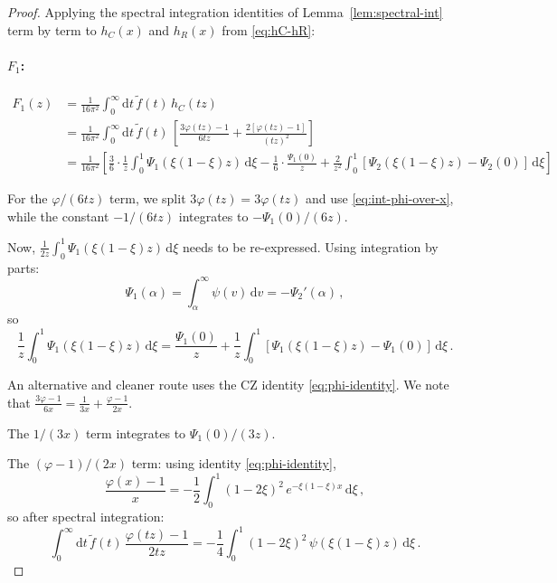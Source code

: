 \documentclass[11pt,a4paper]{article}
\renewcommand{\dd}{\mathrm{d}}
\theoremstyle{definition}
\theoremstyle{remark}
\begin{document}
\begin{proof}
Applying the spectral integration identities of
Lemma~\ref{lem:spectral-int} term by term to
$h_C(x)$ and $h_R(x)$ from \eqref{eq:hC-hR}:

\paragraph{$F_1$:}
\begin{align*}
  F_1(z) &= \frac{1}{16\pi^2}\int_0^\infty\dd t\,\tilde{f}(t)\,
  h_C(tz)\\
  &= \frac{1}{16\pi^2}\int_0^\infty\dd t\,\tilde{f}(t)\,
  \left[\frac{3\varphi(tz)-1}{6tz}
  + \frac{2[\varphi(tz)-1]}{(tz)^2}\right]\\
  &= \frac{1}{16\pi^2}\left[
  \frac{3}{6}\cdot\frac{1}{z}\int_0^1\Psi_1(\xi(1-\xi)z)\,\dd\xi
  - \frac{1}{6}\cdot\frac{\Psi_1(0)}{z}
  + \frac{2}{z^2}\int_0^1[\Psi_2(\xi(1-\xi)z)-\Psi_2(0)]\,\dd\xi
  \right]
\end{align*}

For the $\varphi/(6tz)$ term, we split
$3\varphi(tz) = 3\varphi(tz)$ and use \eqref{eq:int-phi-over-x},
while the constant $-1/(6tz)$ integrates to $-\Psi_1(0)/(6z)$.

Now, $\frac{1}{2z}\int_0^1 \Psi_1(\xi(1-\xi)z)\,\dd\xi$ needs to
be re-expressed.  Using integration by parts:
\begin{equation*}
  \Psi_1(\alpha) = \int_\alpha^\infty \psi(v)\,\dd v
  = -\Psi_2'(\alpha)\,,
\end{equation*}
so
\begin{equation*}
  \frac{1}{z}\int_0^1 \Psi_1(\xi(1-\xi)z)\,\dd\xi
  = \frac{\Psi_1(0)}{z}
  + \frac{1}{z}\int_0^1[\Psi_1(\xi(1-\xi)z) - \Psi_1(0)]\,\dd\xi\,.
\end{equation*}

An alternative and cleaner route uses the CZ identity
\eqref{eq:phi-identity}.  We note that
$\frac{3\varphi-1}{6x} = \frac{1}{3x} + \frac{\varphi-1}{2x}$.

The $1/(3x)$ term integrates to $\Psi_1(0)/(3z)$.

The $(\varphi-1)/(2x)$ term: using identity \eqref{eq:phi-identity},
\begin{equation*}
  \frac{\varphi(x)-1}{x} = -\frac{1}{2}\int_0^1(1-2\xi)^2\,
  e^{-\xi(1-\xi)x}\,\dd\xi\,,
\end{equation*}
so after spectral integration:
\begin{equation*}
  \int_0^\infty \dd t\,\tilde{f}(t)\,
  \frac{\varphi(tz)-1}{2tz}
  = -\frac{1}{4}\int_0^1(1-2\xi)^2\,\psi(\xi(1-\xi)z)\,\dd\xi\,.
\end{equation*}


\end{proof}
\end{document}
